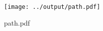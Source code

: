 
    \begin{figure}[H]
      \centering
      \texttt{[image: ../output/path.pdf]}
      \caption{path.pdf}
      \label{fig:path.pdf}
    \end{figure}
